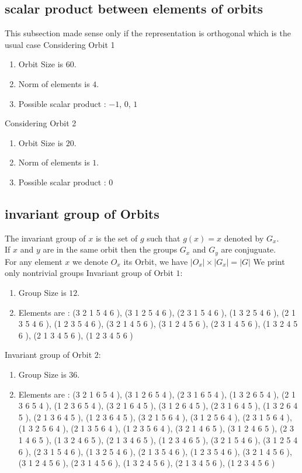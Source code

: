 \documentclass[12pt]{article}
\begin{document}
\subsection{scalar product between elements of orbits}
\noindent This subsection made sense only if the representation is orthogonal which is the usual case
Considering Orbit 1
\begin{enumerate}
\item Orbit Size is $60$.
\item Norm of elements is $4$.
\item Possible scalar product : $-1$, $0$, $1$
\end{enumerate}
Considering Orbit 2
\begin{enumerate}
\item Orbit Size is $20$.
\item Norm of elements is $1$.
\item Possible scalar product : $0$
\end{enumerate}
\subsection{invariant group of Orbits}
\noindent The invariant group of $x$ is the set of $g$ such that $g(x)=x$ denoted by $G_x$.\\
If $x$ and $y$ are in the same orbit then the groups $G_x$ and  $G_y$ are conjuguate.\\
For any element $x$ we denote $O_x$ its Orbit, we have $|O_x|\times |G_x|=|G|$
We print only nontrivial groups
Invariant group of Orbit $1$:
\begin{enumerate}
\item Group Size is $12$.
\item Elements are : (3 2 1 5 4 6  ), (3 1 2 5 4 6  ), (2 3 1 5 4 6  ), (1 3 2 5 4 6  ), (2 1 3 5 4 6  ), (1 2 3 5 4 6  ), (3 2 1 4 5 6  ), (3 1 2 4 5 6  ), (2 3 1 4 5 6  ), (1 3 2 4 5 6  ), (2 1 3 4 5 6  ), (1 2 3 4 5 6  )
\end{enumerate}
Invariant group of Orbit $2$:
\begin{enumerate}
\item Group Size is $36$.
\item Elements are : (3 2 1 6 5 4  ), (3 1 2 6 5 4  ), (2 3 1 6 5 4  ), (1 3 2 6 5 4  ), (2 1 3 6 5 4  ), (1 2 3 6 5 4  ), (3 2 1 6 4 5  ), (3 1 2 6 4 5  ), (2 3 1 6 4 5  ), (1 3 2 6 4 5  ), (2 1 3 6 4 5  ), (1 2 3 6 4 5  ), (3 2 1 5 6 4  ), (3 1 2 5 6 4  ), (2 3 1 5 6 4  ), (1 3 2 5 6 4  ), (2 1 3 5 6 4  ), (1 2 3 5 6 4  ), (3 2 1 4 6 5  ), (3 1 2 4 6 5  ), (2 3 1 4 6 5  ), (1 3 2 4 6 5  ), (2 1 3 4 6 5  ), (1 2 3 4 6 5  ), (3 2 1 5 4 6  ), (3 1 2 5 4 6  ), (2 3 1 5 4 6  ), (1 3 2 5 4 6  ), (2 1 3 5 4 6  ), (1 2 3 5 4 6  ), (3 2 1 4 5 6  ), (3 1 2 4 5 6  ), (2 3 1 4 5 6  ), (1 3 2 4 5 6  ), (2 1 3 4 5 6  ), (1 2 3 4 5 6  )
\end{enumerate}
\end{document}
